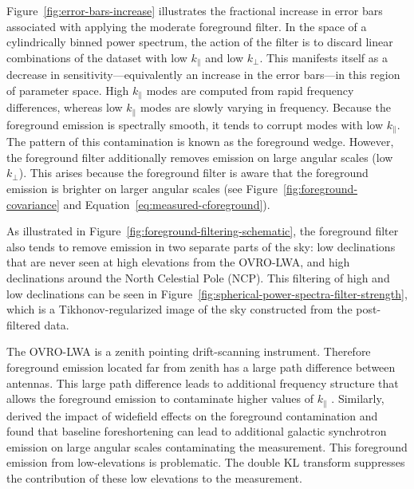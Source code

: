 \begin{bibunit}
Figure~\ref{fig:error-bars-increase} illustrates the fractional increase in error bars associated
with applying the moderate foreground filter. In the space of a cylindrically binned power spectrum,
the action of the filter is to discard linear combinations of the dataset with low $k_\parallel$ and
low $k_\perp$. This manifests itself as a decrease in sensitivity---equivalently an increase in the
error bars---in this region of parameter space.  High $k_\parallel$ modes are computed from rapid
frequency differences, whereas low $k_\parallel$ modes are slowly varying in frequency. Because the
foreground emission is spectrally smooth, it tends to corrupt modes with low $k_\parallel$. The
pattern of this contamination is known as the foreground wedge. However, the foreground filter
additionally removes emission on large angular scales (low $k_\perp$). This arises because the
foreground filter is aware that the foreground emission is brighter on larger angular scales (see
Figure~\ref{fig:foreground-covariance} and Equation~\ref{eq:measured-cforeground}).

As illustrated in Figure~\ref{fig:foreground-filtering-schematic}, the foreground filter also tends
to remove emission in two separate parts of the sky: low declinations that are never seen at high
elevations from the OVRO-LWA, and high declinations around the North Celestial Pole (NCP).  This
filtering of high and low declinations can be seen in
Figure~\ref{fig:spherical-power-spectra-filter-strength}, which is a Tikhonov-regularized image of
the sky constructed from the post-filtered data.

The OVRO-LWA is a zenith pointing drift-scanning instrument.  Therefore foreground emission located
far from zenith has a large path difference between antennas. This large path difference leads to
additional frequency structure that allows the foreground emission to contaminate higher values of
$k_\parallel$ \citep{2012ApJ...752..137M}.  Similarly, \citet{2015ApJ...804...14T} derived the
impact of widefield effects on the foreground contamination and found that baseline foreshortening
can lead to additional galactic synchrotron emission on large angular scales contaminating the
measurement. This foreground emission from low-elevations is problematic. The double KL transform
suppresses the contribution of these low elevations to the measurement.


\end{bibunit}
